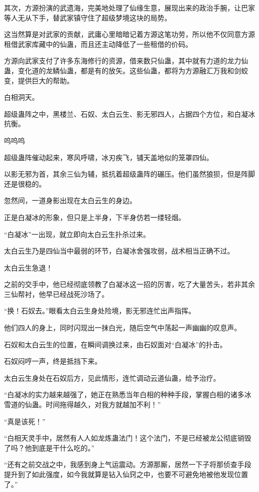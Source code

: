 \begin{this_body}
其次，方源扮演的武遗海，完美地处理了仙缘生意，展现出来的政治手腕，让巴家等人无从下手，替武家镇守住了超级梦境这块的局势。

这当然算是对武家的贡献，武庸心里暗暗记着方源这笔功劳，所以他不仅同意方源租借武家库藏中的仙蛊，而且还主动降低了一些租借的价码。

方源向武家支付了许多东海修行的资源，借来数只仙蛊，其中就有力道的龙力仙蛊，变化道的龙鳞仙蛊，都是有的放矢。这些仙蛊，都将为方源融汇万我和剑蛟变，提供巨大的帮助。

白相洞天。

超级蛊阵之中，黑楼兰、石奴、太白云生、影无邪四人，占据四个方位，和白凝冰抗衡。

呜呜呜

超级蛊阵催动起来，寒风呼啸，冰刃疾飞，铺天盖地似的笼罩四仙。

以影无邪为首，其余三仙为辅，抵抗着超级蛊阵的碾压。他们虽然狼狈，但是阵脚还是很稳的。

忽然间，一道身影出现在太白云生的身边。

正是白凝冰的形象，但只是上半身，下半身仿若一缕轻烟。

“白凝冰”一出现，就立即向太白云生扑杀过来。

太白云生乃是四仙当中最弱的环节，白凝冰舍强攻弱，战术相当正确不过。

太白云生急退！

之前的交手中，他已经彻底领教了白凝冰这一招的厉害，吃了大量苦头，若非其余三仙帮衬，他早已经战死沙场了。

“换！石奴去。”眼看太白云生身处险境，影无邪连忙出声指挥。

他们四人的身上，同时闪现出一抹白光，随后空气中荡起一声幽幽的叹息声。

石奴和太白云生的位置，在瞬间调换过来，由石奴面对“白凝冰”的扑击。

石奴闷哼一声，终是抵挡下来。

太白云生身处在石奴后方，见此情形，连忙调动云道仙蛊，给予治疗。

“白凝冰的实力越来越强了，她正在熟悉当年白相的种种手段，掌握白相的诸多冰雪道的仙蛊。时间拖得越久，对我方就越加不利！”

“真是该死！”

“白相天灵手中，居然有人人如龙炼蛊法门！这个法门，不是已经被龙公彻底销毁了吗？他到底是干什么吃的。”

“还有之前交战之中，我感到身上气运震动。方源那厮，居然一下子将那侦查手段提升到了如此强度，如今我就算是钻入仙窍之中，也要不可避免地被他发现位置了。”


\end{this_body}
